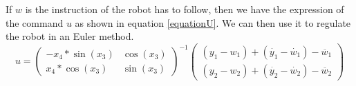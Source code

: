 If $w$ is the instruction of the robot has to follow, then we have the expression of the command $u$ as shown in equation \ref{equationU}. We can then use it to regulate the robot in an Euler method.
\begin{equation}
 u =
\begin{pmatrix}
	-x_4*\sin(x_3) & \cos(x_3)\\
	 x_4*\cos(x_3) & \sin(x_3)
\end{pmatrix}^{-1}
\begin{pmatrix}
	(y_1-w_1) + (\dot{y_1} - \dot{w_1}) -  \ddot{w_1}\\
	(y_2-w_2) + (\dot{y_2} - \dot{w_2}) -  \ddot{w_2}
\end{pmatrix}
\label{equationU}
\end{equation}
